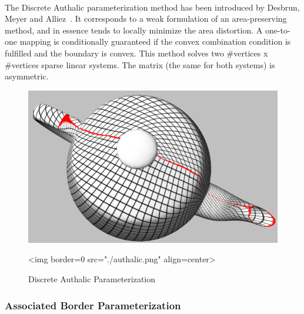   \\

The Discrete Authalic parameterization method has been introduced by
Desbrun, Meyer and Alliez~\cite{cgal:dma-ipsm-02}.  It corresponds to
a weak formulation of an area-preserving method, and in essence tends
to locally minimize the area distortion. A one-to-one mapping is
conditionally guaranteed if the convex combination condition is
fulfilled and the boundary is convex.  This method solves two
\#vertices x \#vertices sparse linear systems. The matrix (the same
for both systems) is asymmetric.

\begin{figure}[bht]
    \begin{center}
        \begin{ccTexOnly}
            \includegraphics{Parameterization/authalic} %
        \end{ccTexOnly}
        \begin{ccHtmlOnly}
            <img border=0 src="./authalic.png" align=center>
        \end{ccHtmlOnly}
        \label{parameterization-fig-authalic}

        \caption{Discrete Authalic Parameterization}
    \end{center}
\end{figure}


\subsubsection{Associated Border Parameterization}

